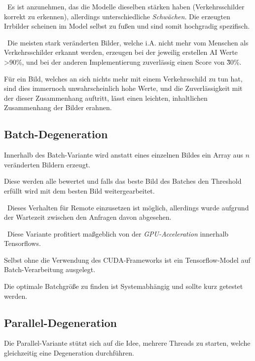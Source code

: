 ~\newline Es ist anzunehmen, das die Modelle dieselben stärken haben (Verkehrsschilder korrekt zu erkennen), allerdings unterschiedliche \textit{Schwächen}. Die erzeugten Irrbilder scheinen im Model selbst zu fußen und sind somit hochgradig spezifisch. 

~\newline Die meisten stark veränderten Bilder, welche i.A. nicht mehr vom Menschen als Verkehrsschilder erkannt werden, erzeugen bei der jeweilig erstellen AI Werte >90\%, und bei der anderen Implementierung zuverlässig einen Score von \~30\%. 

Für ein Bild, welches an sich nichts mehr mit einem Verkehrsschild zu tun hat, sind dies immernoch unwahrscheinlich hohe Werte, und die Zuverlässigkeit mit der dieser Zusammenhang auftritt, lässt einen leichten, inhaltlichen Zusammenhang der Bilder erahnen.

\newpage
\subsection{Batch-Degeneration}
Innerhalb des Batch-Variante wird anstatt eines einzelnen Bildes ein Array aus $n$ veränderten Bildern erzeugt. 

Diese werden alle bewertet und falls das beste Bild des Batches den Threshold erfüllt wird mit dem besten Bild weitergearbeitet. 

~\newline Dieses Verhalten für Remote einzusetzen ist möglich, allerdings wurde aufgrund der Wartezeit zwischen den Anfragen davon abgesehen. 

~\newline Diese Variante profitiert maßgeblich von der \textit{GPU-Acceleration} innerhalb Tensorflows. 

Selbst ohne die Verwendung des CUDA-Frameworks ist ein Tensorflow-Model auf Batch-Verarbeitung ausgelegt. 

Die optimale Batchgröße zu finden ist Systemabhängig und sollte kurz getestet werden. 
\subsection{Parallel-Degeneration}
Die Parallel-Variante stützt sich auf die Idee, mehrere Threads zu starten, welche gleichzeitig eine Degeneration durchführen.

